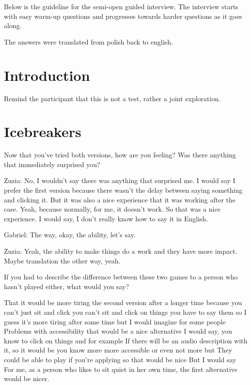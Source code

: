 

Below is the guideline for the semi-open guided interview. 
The interview starts with easy warm-up questions and progresses towards harder questions as it goes along. 

The answers were translated from polish back to english.

\section{Introduction}
Remind the participant that this is not a test, rather a joint exploration.

\section{Icebreakers}

\begin{QandA}
   \item Now that you’ve tried both versions, how are you feeling? Was there anything that immediately surprised you?
         \begin{answered}
            Zuzia: No, I wouldn't say there was anything that surprised me.
            I would say I prefer the first version because there wasn't the delay between saying something and clicking it.
            But it was also a nice experience that it was working after the case.
            Yeah, because normally, for me, it doesn't work.
            So that was a nice experience.
            I would say, I don't really know how to say it in English.


            Gabriel: The way, okay, the ability, let's say.


            Zuzia: Yeah, the ability to make things do a work and they have more impact.
            Maybe translation the other way, yeah.
            \end{answered}

   \item If you had to describe the difference between these two games to a person who hasn't played either, what would you say?
         \begin{answered}
            That it would be more tiring the second version after a longer time because you can't just sit and click you can't sit and click on things you have to say them so I guess it's more tiring after some time but I would imagine for some people
            Problems with accessibility that would be a nice alternative I would say, you know to click on things and for example If there will be an audio description with it, so it would be you know more more accessible or even not more but They could be able to play if you're applying so that would be nice But I would say
            For me, as a person who likes to sit quiet in her own time, the first alternative would be nicer.
         \end{answered}
\end{QandA}




